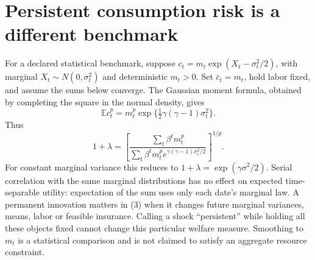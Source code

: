\documentclass[11pt]{article}
\theoremstyle{remark}
\newcommand{\E}{\mathbb E}
\begin{document}
\section{Persistent consumption risk is a different benchmark}
For a declared statistical benchmark, suppose
$c_t=m_t\exp(X_t-\sigma_t^2/2)$, with marginal
$X_t\sim N(0,\sigma_t^2)$ and deterministic $m_t>0$. Set
$\bar c_t=m_t$, hold labor fixed, and assume the sums below converge.
The Gaussian moment formula, obtained by completing the square in the
normal density, gives
\[
 \E c_t^p=m_t^p\exp\{\tfrac12\gamma(\gamma-1)\sigma_t^2\}.
\]
Thus
\[
 1+\lambda=
 \left[
 \frac{\sum_t\beta^tm_t^p}
 {\sum_t\beta^tm_t^p
 e^{\gamma(\gamma-1)\sigma_t^2/2}}
 \right]^{1/p}.                                                  \tag{3}
\]
For constant marginal variance this reduces to
$1+\lambda=\exp(\gamma\sigma^2/2)$. Serial correlation with the same
marginal distributions has no effect on expected time-separable utility:
expectation of the sum uses only each date's marginal law. A permanent
innovation matters in (3) when it changes future marginal variances,
means, labor or feasible insurance. Calling a shock ``persistent'' while
holding all these objects fixed cannot change this particular welfare
measure. Smoothing to $m_t$ is a statistical comparison and is not claimed
to satisfy an aggregate resource constraint.
\end{document}
